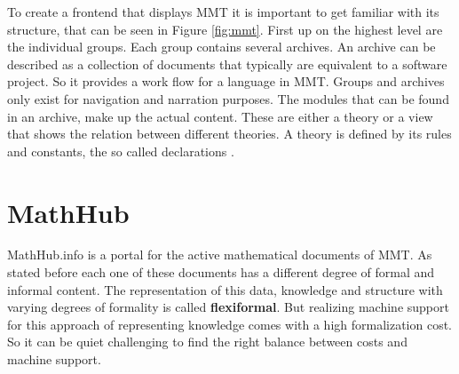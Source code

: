 \documentclass[11pt,a4paper]{article}
\begin{document}
To create a frontend that displays MMT it is important to get familiar with its structure, that can be seen in Figure \ref{fig:mmt}.
First up on the highest level are the individual groups.
Each group contains several archives.
An archive can be described as a collection of documents that typically are equivalent to a software project.
So it provides a work flow for a language in MMT.
Groups and archives only exist for navigation and narration purposes.
The modules that can be found in an archive, make up the actual content.
These are either a theory or a view that shows the relation between different theories.
A theory is defined by its rules and constants, the so called declarations \cite{mmt}.

\section{MathHub} \label{mathhub}
MathHub.info is a portal for the active mathematical documents of MMT.
As stated before each one of these documents has a different degree of formal and informal content.
The representation of this data, knowledge and structure with varying degrees of formality is called \textbf{flexiformal}.
But realizing machine support for this approach of representing knowledge comes with a high formalization cost.
So it can be quiet challenging to find the right balance between costs and machine support.
\end{document}
